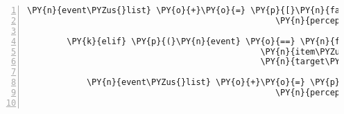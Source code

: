 \begin{Verbatim}[commandchars=\\\{\},numbers=left,firstnumber=1,stepnumber=1]
            \PY{n}{event\PYZus{}list} \PY{o}{+}\PY{o}{=} \PY{p}{[}\PY{n}{fabula}\PY{o}{.}\PY{n}{PerceptionEvent}\PY{p}{(}\PY{n}{identifier}\PY{o}{=}\PY{n}{ID\PYZus{}CASSANDRA}\PY{p}{,}
                                                  \PY{n}{perception}\PY{o}{=}\PY{l+s}{\PYZsq{}}\PY{l+s}{Das möchte ich hier nicht ablegen.}\PY{l+s}{\PYZsq{}}\PY{p}{)}\PY{p}{]}

        \PY{k}{elif} \PY{p}{(}\PY{n}{event} \PY{o}{==} \PY{n}{fabula}\PY{o}{.}\PY{n}{TriesToDropEvent}\PY{p}{(}\PY{n}{identifier}\PY{o}{=}\PY{n}{ID\PYZus{}CASSANDRA}\PY{p}{,}
                                               \PY{n}{item\PYZus{}identifier}\PY{o}{=}\PY{l+s}{\PYZsq{}}\PY{l+s}{pry}\PY{l+s}{\PYZsq{}}\PY{p}{,}
                                               \PY{n}{target\PYZus{}identifier}\PY{o}{=}\PY{l+s}{\PYZsq{}}\PY{l+s}{box}\PY{l+s}{\PYZsq{}}\PY{p}{)}\PY{p}{)}\PY{p}{:}

            \PY{n}{event\PYZus{}list} \PY{o}{+}\PY{o}{=} \PY{p}{[}\PY{n}{fabula}\PY{o}{.}\PY{n}{PerceptionEvent}\PY{p}{(}\PY{n}{identifier}\PY{o}{=}\PY{n}{ID\PYZus{}CASSANDRA}\PY{p}{,}
                                                  \PY{n}{perception}\PY{o}{=}\PY{l+s}{\PYZsq{}}\PY{l+s}{Die Kiste ist aufgebrochen!}\PY{l+s}{\PYZsq{}}\PY{p}{)}\PY{p}{]}


\end{Verbatim}
